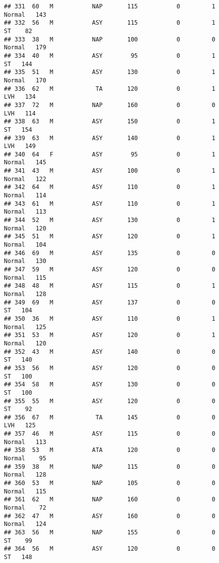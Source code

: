 \documentclass[
]{article}
\begin{document}
\begin{verbatim}
## 331  60   M           NAP       115           0         1     Normal   143
## 332  56   M           ASY       115           0         1         ST    82
## 333  38   M           NAP       100           0         0     Normal   179
## 334  40   M           ASY        95           0         1         ST   144
## 335  51   M           ASY       130           0         1     Normal   170
## 336  62   M            TA       120           0         1        LVH   134
## 337  72   M           NAP       160           0         0        LVH   114
## 338  63   M           ASY       150           0         1         ST   154
## 339  63   M           ASY       140           0         1        LVH   149
## 340  64   F           ASY        95           0         1     Normal   145
## 341  43   M           ASY       100           0         1     Normal   122
## 342  64   M           ASY       110           0         1     Normal   114
## 343  61   M           ASY       110           0         1     Normal   113
## 344  52   M           ASY       130           0         1     Normal   120
## 345  51   M           ASY       120           0         1     Normal   104
## 346  69   M           ASY       135           0         0     Normal   130
## 347  59   M           ASY       120           0         0     Normal   115
## 348  48   M           ASY       115           0         1     Normal   128
## 349  69   M           ASY       137           0         0         ST   104
## 350  36   M           ASY       110           0         1     Normal   125
## 351  53   M           ASY       120           0         1     Normal   120
## 352  43   M           ASY       140           0         0         ST   140
## 353  56   M           ASY       120           0         0         ST   100
## 354  58   M           ASY       130           0         0         ST   100
## 355  55   M           ASY       120           0         0         ST    92
## 356  67   M            TA       145           0         0        LVH   125
## 357  46   M           ASY       115           0         0     Normal   113
## 358  53   M           ATA       120           0         0     Normal    95
## 359  38   M           NAP       115           0         0     Normal   128
## 360  53   M           NAP       105           0         0     Normal   115
## 361  62   M           NAP       160           0         0     Normal    72
## 362  47   M           ASY       160           0         0     Normal   124
## 363  56   M           NAP       155           0         0         ST    99
## 364  56   M           ASY       120           0         0         ST   148

\end{verbatim}
\end{document}
